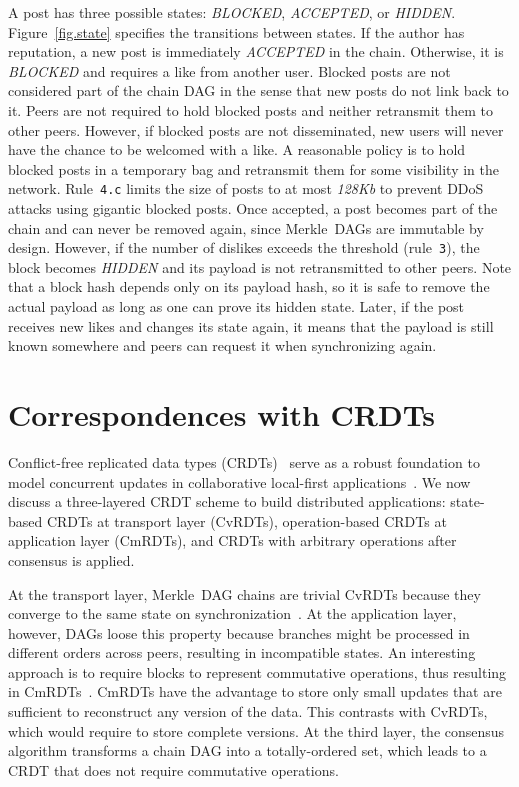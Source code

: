 \documentclass[10pt,journal,compsoc]{IEEEtran}
\begin{document}
A post has three possible states: \emph{BLOCKED}, \emph{ACCEPTED}, or
\emph{HIDDEN}.
Figure~\ref{fig.state} specifies the transitions between states.
%
If the author has reputation, a new post is immediately \emph{ACCEPTED} in the
chain.
Otherwise, it is \emph{BLOCKED} and requires a like from another user.
Blocked posts are not considered part of the chain DAG in the sense that new
posts do not link back to it.
%
Peers are not required to hold blocked posts and neither retransmit them to
other peers.
However, if blocked posts are not disseminated, new users will never have the
chance to be welcomed with a like.
A reasonable policy is to hold blocked posts in a temporary bag and retransmit
them for some visibility in the network.
Rule~\texttt{4.c} limits the size of posts to at most \emph{128Kb} to prevent
DDoS attacks using gigantic blocked posts.
%
Once accepted, a post becomes part of the chain and can never be removed
again, since Merkle~DAGs are immutable by design.
%
However, if the number of dislikes exceeds the threshold (rule~\texttt{3}), the
block becomes \emph{HIDDEN} and its payload is not retransmitted to other
peers.
Note that a block hash depends only on its payload hash, so it is safe to
remove the actual payload as long as one can prove its hidden state.
Later, if the post receives new likes and changes its state again, it means
that the payload is still known somewhere and peers can request it when
synchronizing again.

\section{Correspondences with CRDTs}
\label{sec.crdts}

Conflict-free replicated data types (CRDTs)~\cite{p2p.crdts} serve as a robust
foundation to model concurrent updates in collaborative local-first
applications~\cite{p2p.local}.
%
We now discuss a three-layered CRDT scheme to build distributed applications:
    state-based CRDTs at transport layer (CvRDTs),
    operation-based CRDTs at application layer (CmRDTs), and
    CRDTs with arbitrary operations after consensus is applied.

At the transport layer, Merkle~DAG chains are trivial CvRDTs because they
converge to the same state on synchronization~\cite{p2p.merkle-crdts}.
%
At the application layer, however, DAGs loose this property because branches
might be processed in different orders across peers, resulting in incompatible
states.
An interesting approach is to require blocks to represent commutative
operations, thus resulting in CmRDTs~\cite{p2p.merkle-crdts}.
%
CmRDTs have the advantage to store only small updates that are sufficient to
reconstruct any version of the data.
This contrasts with CvRDTs, which would require to store complete versions.
%
At the third layer, the consensus algorithm transforms a chain DAG into a
totally-ordered set, which leads to a CRDT that does not require commutative
operations.
\end{document}
